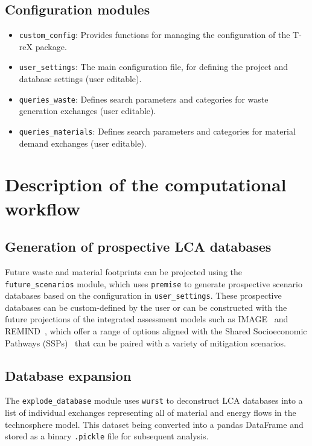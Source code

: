 \documentclass{article}
\renewcommand{\texttt}[1]{{\ttfamily\small\nolinkurl{#1}}}
\begin{document}
\subsection{Configuration modules}
\begin{itemize}
    \item \texttt{custom\_config}: Provides functions for managing the configuration of the T-reX package.
    \item \texttt{user\_settings}: The main configuration file, for defining the project and database settings (user editable).
    \item \texttt{queries\_waste}: Defines search parameters and categories for waste generation exchanges (user editable).
    \item \texttt{queries\_materials}: Defines search parameters and categories for material demand exchanges (user editable).
\end{itemize}

\section{Description of the computational workflow}


\subsection{Generation of prospective LCA databases}

Future waste and material footprints can be projected using the \texttt{future\_scenarios} module, which uses \texttt{premise} to generate prospective scenario databases based on the configuration in \texttt{user\_settings}. These prospective databases can be custom-defined by the user or can be constructed with the future projections of the integrated assessment models such as IMAGE~\citep{stehfest2014image} and REMIND~\citep{remind2020model}, which offer a range of options aligned with the Shared Socioeconomic Pathways (SSPs)~\citep{ssp2020ghg} that can be paired with a variety of mitigation scenarios.

\subsection{Database expansion}
The \texttt{explode\_database} module uses \texttt{wurst} to deconstruct LCA databases into a list of individual exchanges representing all of material and energy flows in the technosphere model. This dataset being converted into a pandas DataFrame and stored as a binary \texttt{.pickle} file for subsequent analysis.
\end{document}
